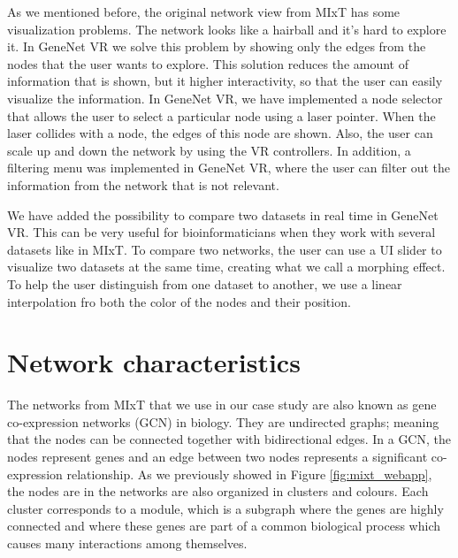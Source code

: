 As we mentioned before, the original network view from MIxT has some visualization problems. The network looks like a hairball and it's hard to explore it. In GeneNet VR we solve this problem by showing only the edges from the nodes that the user wants to explore. This solution reduces the amount of information that is shown, but it higher interactivity, so that the user can easily visualize the information. In GeneNet VR, we have implemented a node selector that allows the user to select a particular node using a laser pointer. When the laser collides with a node, the edges of this node are shown. Also, the user can scale up and down the network by using the VR controllers. In addition, a filtering menu was implemented in GeneNet VR, where the user can filter out the information from the network that is not relevant.

We have added the possibility to compare two datasets in real time in GeneNet VR. This can be very useful for bioinformaticians when they work with several datasets like in MIxT. To compare two networks, the user can use a UI slider to visualize two datasets at the same time, creating what we call a morphing effect. To help the user distinguish from one dataset to another, we use a linear interpolation fro both the color of the nodes and their position.

\section{Network characteristics}
The networks from MIxT that we use in our case study are also known as gene co-expression networks (GCN) in biology. They are undirected graphs; meaning that the nodes can be connected together with bidirectional edges. In a GCN, the nodes represent genes and an edge between two nodes represents a significant co-expression relationship. As we previously showed in Figure \ref{fig:mixt_webapp}, the nodes are in the networks are also organized in clusters and colours. Each cluster corresponds to a module, which is a subgraph where the genes are highly connected and where these genes are part of a common biological process which causes many interactions among themselves.
